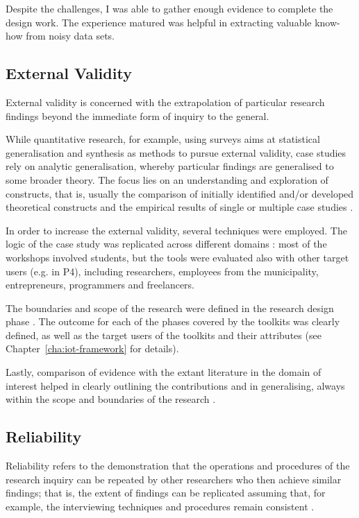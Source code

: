 Despite the challenges, I was able to gather enough evidence to complete the design work. The experience matured was helpful in extracting valuable know-how from noisy data sets.

\subsection{External Validity}
External validity is concerned with the extrapolation of particular research findings beyond the immediate form of inquiry to the general.

While quantitative research, for example, using surveys aims at statistical generalisation and synthesis as methods to pursue external validity, case studies rely on analytic generalisation, whereby particular findings are generalised to some broader theory. The focus lies on an understanding and exploration of constructs, that is, usually the comparison of initially identified and/or developed theoretical constructs and the empirical results of single or multiple case studies \autocite{riege_validity_2003}.

In order to increase the external validity, several techniques were employed. The logic of the case study was replicated across different domains \autocites{eisenhardt_building_1989}{parkhe_messy_1993}: most of the workshops involved students, but the tools were evaluated also with other target users (e.g. in P4), including researchers, employees from the municipality, entrepreneurs, programmers and freelancers.

The boundaries and scope of the research were defined in the research design phase \autocite{marshall_designing_2014}. The outcome for each of the phases covered by the toolkits was clearly defined, as well as the target users of the toolkits and their attributes (see Chapter~\ref{cha:iot-framework} for details).

Lastly, comparison of evidence with the extant literature in the domain of interest helped in clearly outlining the contributions and in generalising, always within the scope and boundaries of the research \autocite{yin_case_2017}.

\subsection{Reliability}
Reliability refers to the demonstration that the operations and procedures of the research inquiry can be repeated by other researchers who then achieve similar findings; that is, the extent of findings can be replicated assuming that, for example, the interviewing techniques and procedures remain consistent \autocite{riege_validity_2003}.

